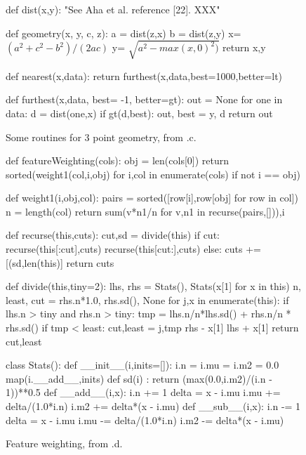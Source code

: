 \begin{figure} 
\begin{python}[left]
def dist(x,y):
   "See Aha et al. reference [22]. XXX"
   
def geometry(x, y, c, z): 
  a = dist(z,x)
  b = dist(z,y) 
  x= $(a^2 + c^2 - b^2)/(2ac)$ 
  y=  $\sqrt{a^2 - max(x,0)^2)}$
  return x,y
  
def nearest(x,data):
  return furthest(x,data,best=1000,better=lt)
 
def furthest(x,data, best= -1, better=gt):  
  out = None
  for one in data:
    d = dist(one,x)
    if gt(d,best): out, best = y, d
  return out
\end{python}
\caption{Some routines for 3 point geometry,  from .c.}\label{fig:code1c}
\end{figure} 


\begin{figure}
\begin{python}[left]
def featureWeighting(cols):
   obj = len(cols[0])
   return sorted(weight1(col,i,obj) 
                for i,col in enumerate(cols)
                if not i == obj)

def weight1(i,obj,col):
  pairs = sorted([row[i],row[obj] for row in col])
  n     = length(col)
  return sum(v*n1/n for v,n1 in recurse(pairs,[])),i

def recurse(this,cuts):
  cut,sd = divide(this)
  if cut:
    recurse(this[:cut],cuts)
    recurse(this[cut:],cuts)
  else:
    cuts += [(sd,len(this)]
  return cuts
    
def divide(this,tiny=2):
  lhs, rhs = Stats(), Stats(x[1] for x in this)
  n, least, cut = rhs.n*1.0, rhs.sd(), None
  for j,x in enumerate(this):
     if lhs.n > tiny and rhs.n > tiny:
       tmp = lhs.n/n*lhs.sd() + rhs.n/n * rhs.sd()
       if tmp < least:
          cut,least = j,tmp
     rhs - x[1]
     lhs + x[1]
  return cut,least
  
class Stats():  
    def __init__(i,inits=[]):
      i.n = i.mu = i.m2 = 0.0
      map(i.__add__,inits)
    def sd(i) :  
      return (max(0.0,i.m2)/(i.n - 1))**0.5
    def __add__(i,x):
      i.n  += 1
      delta = x - i.mu
      i.mu += delta/(1.0*i.n)
      i.m2 += delta*(x - i.mu) 
    def __sub__(i,x):
      i.n  -= 1
      delta = x - i.mu
      i.mu -= delta/(1.0*i.n)
      i.m2 -= delta*(x - i.mu) 
\end{python}
\caption{Feature weighting, from .d.}\label{fig:code1a}
\end{figure}


